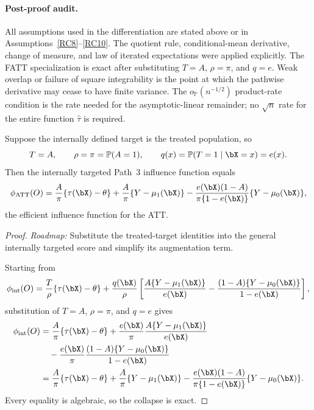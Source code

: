 \documentclass{article}
\renewcommand{\P}{\mathbb{P}}
\begin{document}
\paragraph{Post-proof audit.}
All assumptions used in the differentiation are stated above or in Assumptions~\ref{RC8}--\ref{RC10}. The quotient rule, conditional-mean derivative, change of measure, and law of iterated expectations were applied explicitly. The FATT specialization is exact after substituting $T=A$, $\rho=\pi$, and $q=e$. Weak overlap or failure of square integrability is the point at which the pathwise derivative may cease to have finite variance. The $o_{\P}(n^{-1/2})$ product-rate condition is the rate needed for the asymptotic-linear remainder; no $\sqrt n$ rate for the entire function $\widehat\tau$ is required.

\begin{lemma}\label{lem:path3-collapse}
Suppose the internally defined target is the treated population, so
\[
T=A,
\qquad
\rho=\pi=\P(A=1),
\qquad
q(x)=\P(T=1\mid\bX=x)=e(x).
\]
Then the internally targeted Path~3 influence function equals
\[
\phi_{\mathrm{ATT}}(O)
=
\frac{A}{\pi}\{\tau(\bX)-\theta\}
+
\frac{A}{\pi}\{Y-\mu_1(\bX)\}
-
\frac{e(\bX)(1-A)}
     {\pi\{1-e(\bX)\}}
\{Y-\mu_0(\bX)\},
\]
the efficient influence function for the ATT.
\end{lemma}

\begin{proof}
\textit{Roadmap:} Substitute the treated-target identities into the general internally targeted score and simplify its augmentation term.

Starting from
\[
\phi_{\mathrm{int}}(O)
=
\frac{T}{\rho}\{\tau(\bX)-\theta\}
+
\frac{q(\bX)}{\rho}
\left[
\frac{A\{Y-\mu_1(\bX)\}}{e(\bX)}
-
\frac{(1-A)\{Y-\mu_0(\bX)\}}{1-e(\bX)}
\right],
\]
substitution of $T=A$, $\rho=\pi$, and $q=e$ gives
\begin{align*}
\phi_{\mathrm{int}}(O)
&=
\frac{A}{\pi}\{\tau(\bX)-\theta\}
+
\frac{e(\bX)}{\pi}
\frac{A\{Y-\mu_1(\bX)\}}{e(\bX)}\\
&\quad-
\frac{e(\bX)}{\pi}
\frac{(1-A)\{Y-\mu_0(\bX)\}}{1-e(\bX)}
\\
&=
\frac{A}{\pi}\{\tau(\bX)-\theta\}
+
\frac{A}{\pi}\{Y-\mu_1(\bX)\}
-
\frac{e(\bX)(1-A)}
     {\pi\{1-e(\bX)\}}
\{Y-\mu_0(\bX)\}.
\end{align*}
Every equality is algebraic, so the collapse is exact.
\end{proof}
\end{document}
